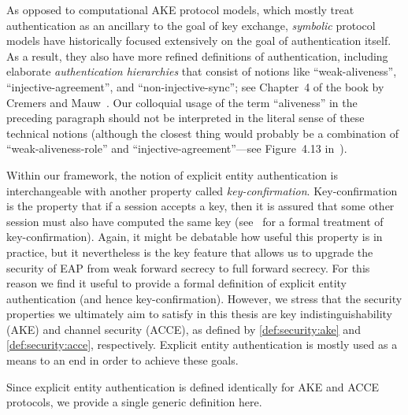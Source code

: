 \begin{remark}
As opposed to computational AKE protocol models,
which mostly treat authentication as an ancillary to the goal of key exchange,
\emph{symbolic} protocol models have historically focused extensively on the goal of authentication itself.
As a result,
they also have more refined definitions of authentication,
including elaborate \emph{authentication hierarchies}
that consist of notions like ``weak-aliveness'', ``injective-agreement'', and ``non-injective-sync'';
see Chapter~4 of the book by Cremers and Mauw~\cite{CremersM:2012:book:operational_semantics}.
Our colloquial usage of the term ``aliveness'' in the preceding paragraph should not be interpreted in the literal sense of these technical notions
(although the closest thing would probably be a combination of ``weak-aliveness-role'' and ``injective-agreement''---see Figure~4.13 in~\cite{CremersM:2012:book:operational_semantics}). 
\end{remark}

Within our framework,
the notion of explicit entity authentication is interchangeable with another property called \emph{key-confirmation}.
Key-confirmation is the property that if a session accepts a key,
then it is  assured that some other session must also have computed the same key
(see~\cite{SP:FGSW16} for a formal treatment of key-confirmation).
Again,
it might be debatable how useful this property is in practice,
but it nevertheless is the key feature that allows us to upgrade the security of EAP from weak forward secrecy to full forward secrecy.
For this reason we find it useful to provide a formal definition of explicit entity authentication
(and hence key-confirmation).
However,
we stress that the security properties we ultimately aim to satisfy in this thesis are key indistinguishability (AKE) 
and channel security (ACCE),
as defined by \cref{def:security:ake} and \cref{def:security:acce}, respectively.
Explicit entity authentication is mostly used as a means to an end in order to achieve these goals.

Since explicit entity authentication is defined identically for AKE and ACCE protocols,
we provide a single generic definition here.


